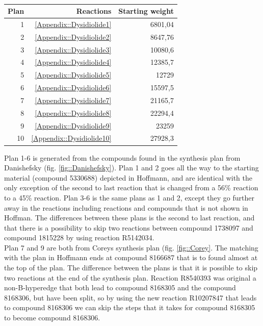 \documentclass[a4paper,10pt,titlepage]{paper}
\begin{document}
\begin{table}[H]
\centering
\begin{tabular}{|r|r|r|}
\hline
Plan & Reactions & Starting weight \\ \hline
1 & \ref{Appendix::Dysidiolide1} & 6801,04 \\\hline
2 & \ref{Appendix::Dysidiolide2} & 8647,76 \\\hline
3 & \ref{Appendix::Dysidiolide3} & 10080,6 \\\hline
4 & \ref{Appendix::Dysidiolide4} & 12385,7 \\\hline
5 & \ref{Appendix::Dysidiolide5} & 12729 \\\hline
6 & \ref{Appendix::Dysidiolide6} & 15597,5 \\\hline
7 & \ref{Appendix::Dysidiolide7} & 21165,7 \\\hline
8 & \ref{Appendix::Dysidiolide8} & 22294,4 \\\hline
9 & \ref{Appendix::Dysidiolide9} & 23259 \\\hline
10 & \ref{Appendix::Dysidiolide10} & 27928,3 \\\hline
\end{tabular}
\caption{}
\label{tab::DysidiolideResults}
\end{table}

Plan 1-6 is generated from the compounds found in the synthesis plan from Danishefsky (fig. \ref{fig::Danishefsky}). Plan 1 and 2 goes all the way to the starting material (compound 5330688) depicted in Hoffmann, and are identical with the only exception of the second to last reaction that is changed from a 56\% reaction to a 45\% reaction. Plan 3-6 is the same plans as 1 and 2, except they go further away in the reactions including reactions and compounds that is not shown in Hoffman. The differences between these plans is the second to last reaction, and that there is a possibility to skip two reactions between compound 1738097 and compound 1815228 by using reaction R5142034.\\

Plan 7 and 9 are both from Coreys synthesis plan (fig. \ref{fig::Corey}. The matching with the plan in Hoffmann ends at compound 8166687 that is to found almost at the top of the plan. The difference between the plans is that it is possible to skip two reactions at the end of the synthesis plan. Reaction R8540393 was original a non-B-hyperedge that both lead to compound 8168305 and the compound 8168306, but have been split, so by using the new reaction R10207847 that leads to  compound 8168306 we can skip the steps that it takes for compound 8168305 to become compound 8168306.\\
\end{document}
